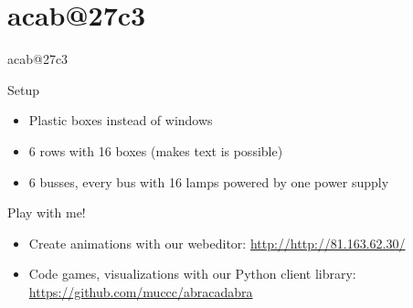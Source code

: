 \documentclass{beamer}
\begin{document}
\section{acab@27c3}
  \begin{frame}{acab@27c3}
      \begin{block}{Setup}
            \begin{itemize}
               \item Plastic boxes instead of windows
               \item 6 rows with 16 boxes (makes text is possible)
               \item 6 busses, every bus with 16 lamps powered by one power supply
            \end{itemize}
	\end{block}
	\begin{block}{Play with me!}
	    \begin{itemize}
		\item Create animations with our webeditor:
		    \url{http://http://81.163.62.30/}
		\item Code games, visualizations with our Python client
		    library: \url{https://github.com/muccc/abracadabra}
	    \end{itemize}
	\end{block}
  \end{frame}
\end{document}
